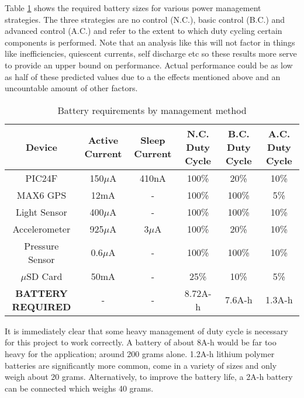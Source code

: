 \documentclass[12pt,openany,a4paper]{book}
\begin{document}
		Table \ref{tab:PWR} shows the required battery sizes for various power management strategies. The three strategies are no control (N.C.), basic control (B.C.) and advanced control (A.C.) and refer to the extent to which duty cycling certain components is performed. Note that an analysis like this will not factor in things like inefficiencies, quiescent currents,  self discharge etc so these results more serve to provide an upper bound on performance. Actual performance could be as low as half of these predicted values due to a the effects mentioned above and an uncountable amount of other factors.\\ %
		
		\begin{table}[H]
			\centering
			\begin{adjustbox}{max width=\textwidth}
				\begin{tabular}{c | c | c | c | c | c }
					Device & Active Current & Sleep Current & N.C. Duty Cycle & B.C. Duty Cycle & A.C. Duty Cycle\\
					\hline
					PIC24F          & 150$\mu$A & 410nA  & 100\% & 20\%  & 10\%  \\
					MAX6 GPS        & 12mA      & -      & 100\% & 100\% & 5\%   \\
					Light Sensor    & 400$\mu$A & -      & 100\% & 100\% & 10\%  \\
					Accelerometer   & 925$\mu$A & 3$\mu$A& 100\% & 20\%  & 10\%  \\
					Pressure Sensor & 0.6$\mu$A & -      & 100\% & 100\% & 10\%  \\
					$\mu$SD Card    & 50mA      & -      & 25\%  & 10\%  & 5\%   \\
					\hline
					\bf BATTERY REQUIRED & - & - & 8.72A-h & 7.6A-h & 1.3A-h\\
				\end{tabular}
			\end{adjustbox}
			\caption{Battery requirements by management method}
			\label{tab:PWR}
		\end{table}		
		
		It is immediately clear that some heavy management of duty cycle is necessary for this project to work correctly. A battery of about 8A-h would be far too heavy for the application; around 200 grams alone. 1.2A-h lithium polymer batteries are significantly more common, come in a variety of sizes and only weigh about 20 grams. Alternatively, to improve the battery life, a 2A-h battery can be connected which weighs 40 grams.
		
\end{document}
